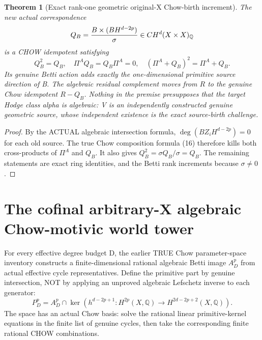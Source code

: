 \documentclass[11pt]{article}
\newcommand{\Q}{\mathbb Q}
\newtheorem{theorem}{Theorem}
\begin{document}
\begin{theorem}[Exact rank-one geometric original-X Chow-birth increment]
The new actual correspondence
\[
 Q_B={B\times (BH^{d-2p})\over\sigma}
                    \in CH^d(X\times X)_\Q
\]
is a CHOW idempotent satisfying
\[
 \boxed{Q_B^2=Q_B,\quad \Pi^AQ_B=Q_B\Pi^A=0,
 \quad(\Pi^A+Q_B)^2=\Pi^A+Q_B.}                    \tag{18}
\]
Its genuine Betti action adds exactly the one-dimensional
primitive source direction of B. The algebraic residual
complement moves from \(R\) to the genuine Chow idempotent
\(R-Q_B\). Nothing in the premise presupposes that the
target Hodge class alpha is algebraic: V is an independently
constructed genuine geometric source, whose independent
existence is the exact source-birth challenge.
\end{theorem}
\begin{proof}
By the ACTUAL algebraic intersection formula,
\(\deg(B Z_i H^{d-2p})=0\) for each old source.
The true Chow composition formula (16) therefore kills
both cross-products of \(\Pi^A\) and \(Q_B\).
It also gives \(Q_B^2=\sigma Q_B/\sigma=Q_B\).
The remaining statements are exact ring identities,
and the Betti rank increments because \(\sigma\ne0\).
\end{proof}

\section{The cofinal arbitrary-X algebraic Chow-motivic world tower}
For every effective degree budget D, the earlier TRUE
Chow parameter-space inventory constructs a finite-dimensional
rational algebraic Betti image \(A_D^p\) from actual effective
cycle representatives. Define the primitive part by genuine
intersection, NOT by applying an unproved algebraic Lefschetz
inverse to each generator:
\[
 P_D^p=A_D^p\cap
       \ker(h^{d-2p+1}:H^{2p}(X,\Q)
                        \to H^{2d-2p+2}(X,\Q)).      \tag{19}
\]
The space has an actual Chow basis: solve the rational linear
primitive-kernel equations in the finite list of genuine cycles,
then take the corresponding finite rational CHOW combinations.
\end{document}
